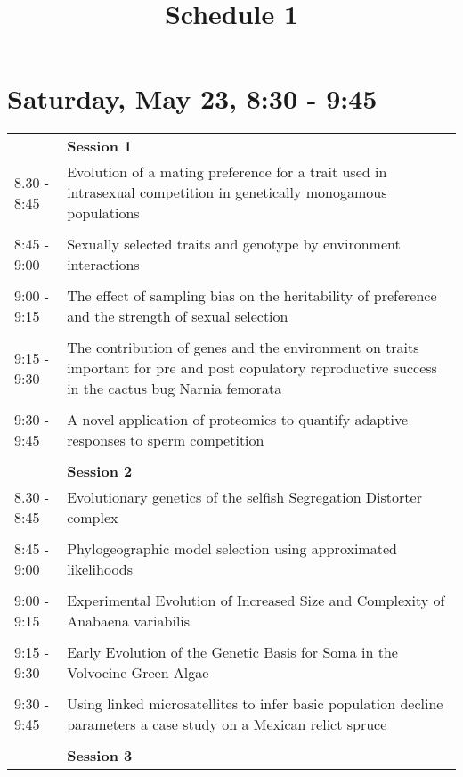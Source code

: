 \documentclass{article}
\title{Schedule 1}
\date{}
\begin{document}
\maketitle{}
\section{Saturday, May 23, 8:30 - 9:45}
\begin{longtabu} to \textwidth {lX}
 & \textbf{Session 1} \\ 

8.30 - 8:45 & Evolution of a mating preference for a trait used in intrasexual competition in genetically monogamous populations \\ 
 &  \\ 
8:45 - 9:00 & Sexually selected traits and genotype by environment interactions \\ 
 &  \\ 
9:00 - 9:15 & The effect of sampling bias on the heritability of preference and the strength of  sexual selection \\ 
 &  \\ 
9:15 - 9:30 & The contribution of genes and the environment on traits important for pre and post copulatory reproductive success in the cactus bug  Narnia femorata \\ 
 &  \\ 
9:30 - 9:45 & A novel application of proteomics to quantify adaptive responses to sperm competition \\ 
 &  \\ 
 & \textbf{Session 2} \\ 

8.30 - 8:45 & Evolutionary genetics of the selfish Segregation Distorter complex \\ 
 &  \\ 
8:45 - 9:00 & Phylogeographic model selection using approximated likelihoods \\ 
 &  \\ 
9:00 - 9:15 & Experimental Evolution of Increased Size and Complexity of Anabaena variabilis \\ 
 &  \\ 
9:15 - 9:30 & Early Evolution of the Genetic Basis for Soma in the Volvocine Green Algae \\ 
 &  \\ 
9:30 - 9:45 & Using linked microsatellites to infer basic population decline parameters  a case study on a Mexican relict spruce \\ 
 &  \\ 
 & \textbf{Session 3} \\ 


\end{longtabu}
\end{document}
